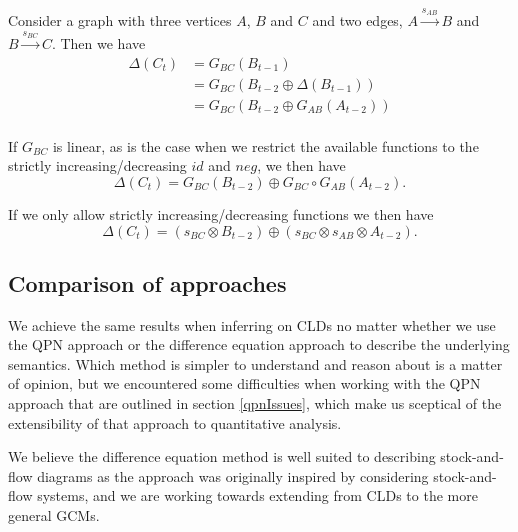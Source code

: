 Consider a graph with three vertices $A$, $B$ and $C$ and two edges,
$A\xrightarrow{s_{AB}} B$ and $B\xrightarrow{s_{BC}} C$.
%
Then we have
\begin{align*}
\Delta(C_t) &= G_{BC}(B_{t-1})\\
&= G_{BC}(B_{t-2} \oplus \Delta(B_{t-1}))\\
&= G_{BC}(B_{t-2} \oplus G_{AB}(A_{t-2}))\\
\end{align*}

If $G_{BC}$ is linear, as is the case when we restrict the available
functions to the strictly increasing/decreasing $id$ and $neg$, we
then have
%
\[\Delta(C_t) = G_{BC}(B_{t-2})\oplus G_{BC}\circ G_{AB}(A_{t-2}).\]

If we only allow strictly increasing/decreasing functions we then have
%
\[\Delta(C_t) = (s_{BC}\otimes B_{t-2})\oplus (s_{BC}\otimes
  s_{AB}\otimes A_{t-2}).\]

\subsection{Comparison of approaches}

We achieve the same results when inferring on CLDs no matter whether
we use the QPN approach or the difference equation approach to
describe the underlying semantics.
%
Which method is simpler to understand and reason about is a matter of
opinion, but we encountered some difficulties when working with the
QPN approach that are outlined in section \ref{qpnIssues}, which make
us sceptical of the extensibility of that approach to quantitative
analysis.

We believe the difference equation method is well suited to describing
stock-and-flow diagrams as the approach was originally inspired by
considering stock-and-flow systems, and we are working towards
extending from CLDs to the more general GCMs.
